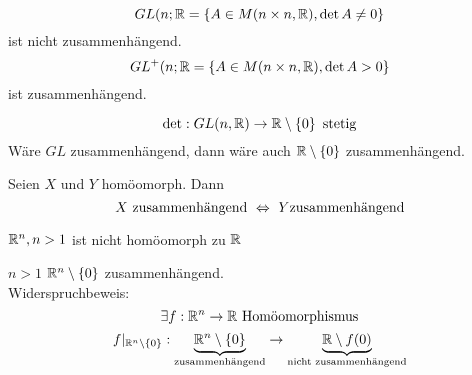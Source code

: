 \begin{Sat}
  \[GL(n;\mathbb{R}=\left\{ A\in M(n\times n,\mathbb{R}), \det A\neq 0 \right\}\]
  ist nicht zusammenhängend.
  \[GL^+(n;\mathbb{R}=\left\{ A\in M(n\times n,\mathbb{R}), \det A> 0 \right\}\]
  ist zusammenhängend.
\end{Sat}
\begin{Bew}
  \[\det:GL(n,\mathbb{R})\to\mathbb{R}\setminus\left\{ 0 \right\}\ \text{stetig}\]
  Wäre $GL$ zusammenhängend, dann wäre auch $\mathbb{R}\setminus\left\{ 0 \right\}$ zusammenhängend.
\end{Bew}
\begin{Sat}
  Seien $X$ und $Y$ homöomorph. Dann
  \[X\ \text{zusammenhängend}\ \Lra\ Y\text{zusammenhängend}\]
\end{Sat}
\begin{Kor}
  $\mathbb{R}^n,n>1$ ist nicht homöomorph zu $\mathbb{R}$
\end{Kor}
\begin{Bew}
  $n>1$ $\mathbb{R}^n\setminus\left\{ 0 \right\}$ zusammenhängend.\\
  Widerspruchbeweis:
  \[\exists f:\mathbb{R}^n\to\mathbb{R}\ \text{Homöomorphismus}\]
  \[f|_{\mathbb{R}^n\setminus\left\{ 0 \right\}}:\underbrace{\mathbb{R}^n\setminus\left\{ 0 \right\}}_{\text{zusammenhängend}}\to\underbrace{\mathbb{R}\setminus f(0)}_{\text{nicht zusammenhängend}}\]
\end{Bew}
